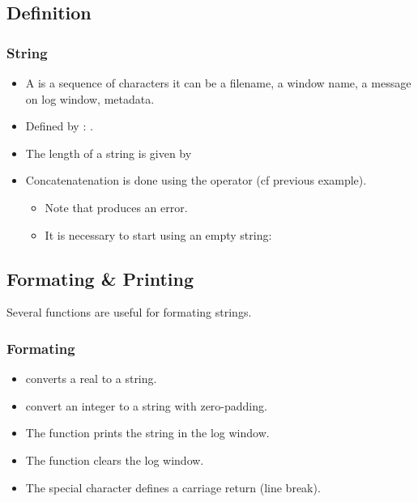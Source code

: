 \subsection{Definition}
\begin{frame}[fragile]
  \frametitle<presentation>{String}
  \begin{itemize}
  \item A  is a sequence of characters it can be a
    filename, a window name, a message on log window, metadata.
  \item Defined by : .
  \item The length of a string is given by 
  \item Concatenatenation is done using the operator \code{+} (cf previous example).
    \begin{itemize}
    \item Note that  produces an error.
    \item It is necessary to start using an empty string: 
    \end{itemize}
  \end{itemize}
\end{frame}

\subsection{Formating \& Printing}

Several functions are useful for formating strings.

\begin{frame}[fragile]
  \frametitle<presentation>{Formating}
  \begin{itemize}
  \item {} converts a real to a string.
  \item {} convert an integer to a string with zero-padding.
  \item The function  prints the string in the log window.
  \item The function  clears the log window.
  \item The special character  defines a carriage return (line break).
  \end{itemize}
\end{frame}

